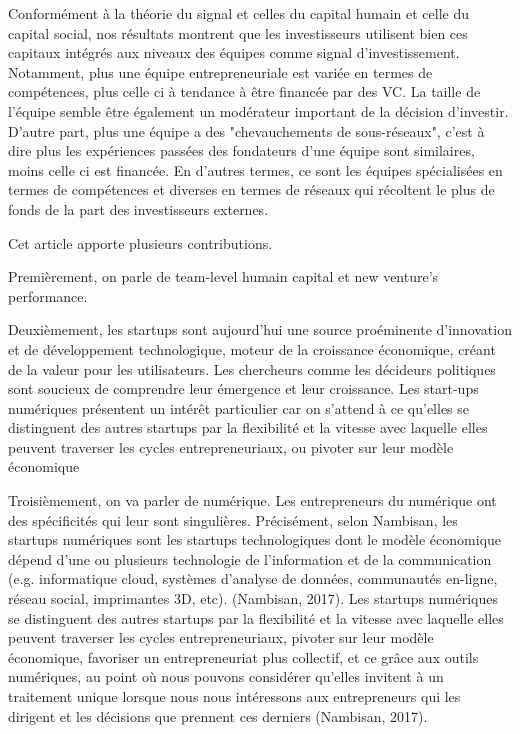 \documentclass[11pt]{article}
\begin{document}
Conformément à la théorie du signal et celles du capital humain et celle du capital social, nos résultats montrent que les investisseurs utilisent bien ces capitaux intégrés aux niveaux des équipes comme signal d'investissement. Notamment, plus une équipe entrepreneuriale est variée en termes de compétences, plus celle ci à tendance à être financée par des VC. La taille de l'équipe semble être également un modérateur important de la décision d'investir. D'autre part, plus une équipe a des "chevauchements de sous-réseaux", c'est à dire plus les expériences passées des fondateurs d'une équipe sont similaires, moins celle ci est financée. En d'autres termes, ce sont les équipes spécialisées en termes de compétences et diverses en termes de réseaux qui récoltent le plus de fonds de la part des investisseurs externes.

Cet article apporte plusieurs contributions.

Premièrement, on parle de team-level humain capital et new venture's performance.

Deuxièmement, les startups sont aujourd'hui une source proéminente d'innovation et de développement technologique, moteur de la croissance économique, créant de la valeur pour les utilisateurs. Les chercheurs comme les décideurs politiques sont soucieux de comprendre leur émergence et leur croissance. Les start-ups numériques présentent un intérêt particulier car on s'attend à ce qu'elles se distinguent des autres startups par la flexibilité et la vitesse avec laquelle elles peuvent traverser les cycles entrepreneuriaux, ou pivoter sur leur modèle économique \citep{nambisan2017digital}



Troisièmement, on va parler de numérique. Les entrepreneurs du numérique ont des spécificités qui leur sont singulières. Précisément, selon Nambisan, les startups numériques sont les startups technologiques dont le modèle économique dépend d’une ou plusieurs technologie de l’information et de la communication (e.g. informatique cloud, systèmes d’analyse de données, communautés en-ligne, réseau social, imprimantes 3D, etc). (Nambisan, 2017). Les startups numériques se distinguent des autres startups par la flexibilité et la vitesse avec laquelle elles peuvent traverser les cycles entrepreneuriaux, pivoter sur leur modèle économique, favoriser un entrepreneuriat plus collectif, et ce grâce aux outils numériques, au point où nous pouvons considérer qu’elles invitent à un traitement unique lorsque nous nous intéressons aux entrepreneurs qui les dirigent et les décisions que prennent ces derniers (Nambisan, 2017).
\end{document}
